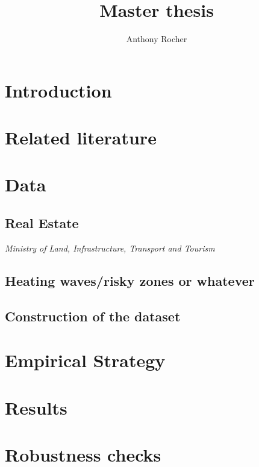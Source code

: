 \documentclass{article}
\title{Master thesis}
\author{Anthony Rocher}
\date{}
\begin{document}
\maketitle

\begin{abstract}
    
\end{abstract}


\section{Introduction}


\section{Related literature}


\section{Data}

\subsection{Real Estate}

\textit{Ministry of Land, Infrastructure, Transport and Tourism}

\subsection{Heating waves/risky zones or whatever}

\subsection{Construction of the dataset}


\section{Empirical Strategy}


\section{Results}


\section{Robustness checks}

\end{document}
